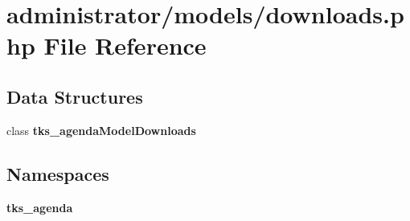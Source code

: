 \section{administrator/models/downloads.php File Reference}
\label{administrator_2models_2downloads_8php}
\subsection*{Data Structures}
\begin{DoxyCompactItemize}
\item 
class \textbf{ tks\+\_\+agenda\+Model\+Downloads}
\end{DoxyCompactItemize}
\subsection*{Namespaces}
\begin{DoxyCompactItemize}
\item 
 \textbf{ tks\+\_\+agenda}
\end{DoxyCompactItemize}
